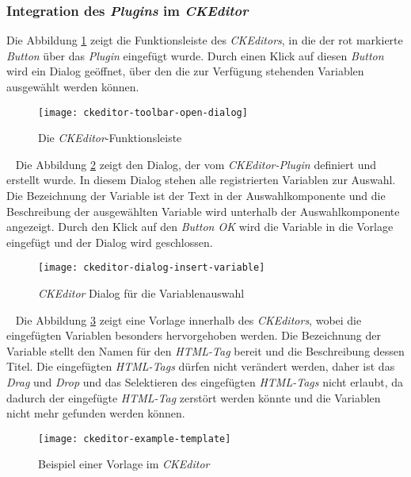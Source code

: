 \subsubsection{Integration des \emph{Plugins} im \emph{CKEditor}}
Die Abbildung \ref{fig:ckeditor-toolbar-opne-dialog} zeigt die Funktionsleiste des \emph{CKEditors}, in die der rot markierte \emph{Button} über das \emph{Plugin} eingefügt wurde. Durch einen Klick auf diesen \emph{Button} wird ein Dialog geöffnet, über den die zur Verfügung stehenden Variablen ausgewählt werden können.
\begin{figure}[h]
\centering
\texttt{[image: ckeditor-toolbar-open-dialog]}
\caption{Die \emph{CKEditor}-Funktionsleiste}
\label{fig:ckeditor-toolbar-opne-dialog}
\end{figure}
\ \newline
Die Abbildung \ref{fig:ckeditor-dialog-insert-variable} zeigt den Dialog, der vom \emph{CKEditor-Plugin} definiert und erstellt wurde. In diesem Dialog stehen alle registrierten Variablen zur Auswahl. Die Bezeichnung der Variable ist der Text in der Auswahlkomponente und die Beschreibung der ausgewählten Variable wird unterhalb der Auswahlkomponente angezeigt. Durch den Klick auf den \emph{Button OK} wird die Variable in die Vorlage eingefügt und der Dialog wird geschlossen.
\newpage
\begin{figure}[h]
\centering
\texttt{[image: ckeditor-dialog-insert-variable]}
\caption{\emph{CKEditor} Dialog für die Variablenauswahl}
\label{fig:ckeditor-dialog-insert-variable}
\end{figure}
\ \newline
Die Abbildung \ref{fig:ckeditor-example-template} zeigt eine Vorlage innerhalb des \emph{CKEditors}, wobei die eingefügten Variablen besonders hervorgehoben werden. Die Bezeichnung  der Variable stellt den Namen für den \emph{HTML-Tag} bereit und die Beschreibung dessen Titel. Die eingefügten \emph{HTML-Tags} dürfen nicht verändert werden, daher ist das \emph{Drag} und \emph{Drop} und das Selektieren des eingefügten \emph{HTML-Tags} nicht erlaubt, da dadurch der eingefügte \emph{HTML-Tag} zerstört werden könnte und die Variablen nicht mehr gefunden werden können.
\begin{figure}[h]
\centering
\texttt{[image: ckeditor-example-template]}
\caption{Beispiel einer Vorlage im \emph{CKEditor}}
\label{fig:ckeditor-example-template}
\end{figure}
\newpage


